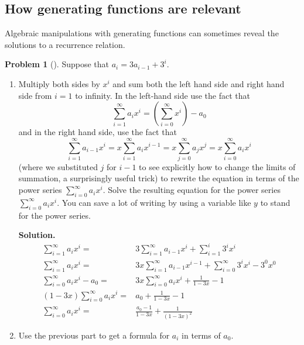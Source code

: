 \documentclass[10pt,]{book}
\theoremstyle{plain}
\theoremstyle{definition}
\newtheorem{activity}[project]{Problem}
\theoremstyle{definition}
\numberwithin{equation}{chapter}
\newcommand{\amp}{&}
\begin{document}
\subsection[{How generating functions are relevant}]{How generating functions are relevant}\label{subsection-39}
Algebraic manipulations with generating functions can sometimes reveal the solutions to a recurrence relation.%
\begin{activity}[]\label{substituteandsolve}
Suppose that \(a_i=3a_{i-1} + 3^i\).%
\begin{enumerate}[font=\bfseries,label=(\alph*),ref=\alph*]
\item\label{task-153} Multiply both sides by \(x^i\) and sum both the left hand side and right hand side from \(i=1\) to infinity.  In the left-hand side use the fact that%
\begin{equation*}
\sum_{i=1}^\infty a_ix^i = (\sum_{i=0}^\infty x^i) -a_0
\end{equation*}
and in the right hand side, use the fact that%
\begin{equation*}
\sum_{i=1}^\infty a_{i-1}x^i = x\sum_{i=1}^\infty a_ix^{i-1}
=x\sum_{j=0}^\infty a_jx^j =x\sum_{i=0}^\infty a_ix^i
\end{equation*}
(where we substituted \(j\) for \(i-1\) to see explicitly how to change the limits of summation, a surprisingly useful trick) to rewrite the equation in terms of the power series \(\sum_{i=0}^\infty a_ix^i\).  Solve the resulting equation for the power series \(\sum_{i=0}^\infty a_ix^i\). You can save a lot of writing by using a variable like \(y\) to stand for the power series.%
\par\medskip\noindent%
\textbf{Solution.}\quad %
\begin{align*}
\sum_{i=1}^\infty a_ix^i  =\amp 3\sum_{i=1}^\infty
a_{i-1}x^i+\sum_{i=1}^i3^ix^i\\
\sum_{i=1}^\infty a_ix^i =\amp 3x\sum_{i=1}^\infty a_{i-1}x^{i-1}+
\sum_{i=0}^\infty 3^ix^i-3^0x^0\\
\sum_{i=0}^\infty a_ix^i -a_0 =\amp 3x\sum_{i=0}^\infty a_{i}x^{i}+
\frac{1}{1-3x}-1\\
(1-3x)\sum_{i=0}^\infty a_ix^i  =\amp a_0+\frac{1}{1-3x} -1\\
\sum_{i=0}^\infty a_ix^i  =\amp \frac{a_0-1}{1-3x}+\frac{1}{(1-3x)^2}
\end{align*}
%
\item\label{task-154} Use the previous part to get a formula for \(a_i\) in terms of \(a_0\).%
\par\medskip\noindent%

\end{enumerate}
\end{activity}
\end{document}

